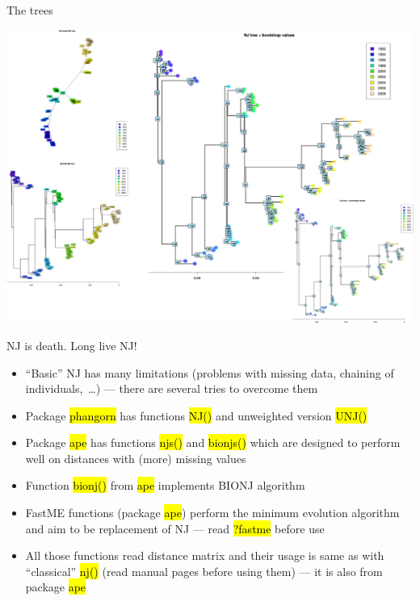 \documentclass[compress, ucs, xelatex, 11pt, xcolor=svgnames,
	hyperref={
		bookmarks=true,
		unicode=true,
		colorlinks=true,
		pdftitle={Molecular data in R},
		plainpages=false,
		pdfauthor={Vojtech Zeisek},
		pdfsubject={Course about phylogeny and evolution in R},
		pdfcreator={XeLaTeX},
		pdfkeywords={R, evolution, phylogeny, molecular data},
		linkcolor=Tomato,
		anchorcolor=SaddleBrown,
		citecolor=Goldenrod,
		filecolor=DarkMagenta,
		menucolor=Sienna,
		urlcolor=DarkTurquoise,
		pdftex},
	url={hyphens, lowtilde} %
	]{beamer}
\renewcommand{\texttt}[1]{\hl{\ttfamily #1}}
\begin{document}
\begin{frame}{The trees}
	\begin{center}
		\includegraphics[width=\textwidth-2.5cm]{nj_dna.png}
	\end{center}
	\end{frame}

\begin{frame}{NJ is death. Long live NJ!}
	\label{NJ-replacement}
	\begin{itemize}
		\item ``Basic'' NJ has many limitations (problems with missing data, chaining of individuals,~\ldots) --- there are several tries to overcome them
		\item Package \texttt{phangorn} has functions \texttt{NJ()} and unweighted version \texttt{UNJ()}
		\item Package \texttt{ape} has functions \texttt{njs()} and \texttt{bionjs()} which are designed to perform well on distances with (more) missing values
		\item Function \texttt{bionj()} from \texttt{ape} implements BIONJ algorithm
		\item FastME functions (package \texttt{ape}) perform the minimum evolution algorithm and aim to be replacement of NJ --- read \texttt{?fastme} before use
		\item All those functions read distance matrix and their usage is same as with ``classical'' \texttt{nj()} (read manual pages before using them) --- it is also from package \texttt{ape}
	\end{itemize}
\end{frame}
\end{document}

